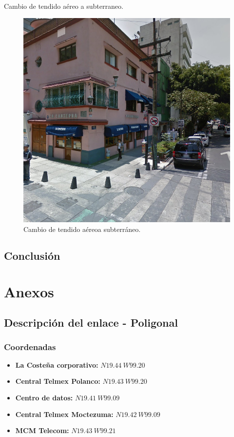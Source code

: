 \documentclass[12pt,letterpaper]{article}
\begin{document}
\newpage
Cambio de tendido aéreo a subterraneo.
\begin{figure}[ht]
    \centering
    \includegraphics[scale=.6]{imagenes/pc3.png}
    \caption{Cambio de tendido aéreoa subterráneo.}
\end{figure}

\newpage
\subsection{Conclusión}

\newpage
\section{Anexos}
\subsection{Descripción del enlace - Poligonal}
\subsubsection{Coordenadas}
\begin{itemize}
    \item \textbf{La Costeña corporativo:} $N 19.44 \ W 99.20$
    \item \textbf{Central Telmex Polanco:} $N 19.43 \ W 99.20$
    \item \textbf{Centro de datos:} $N 19.41 \ W 99.09$
    \item \textbf{Central Telmex Moctezuma:} $N 19.42 \ W 99.09$
    \item \textbf{MCM Telecom:} $N 19.43 \ W 99.21$
\end{itemize}
\end{document}
